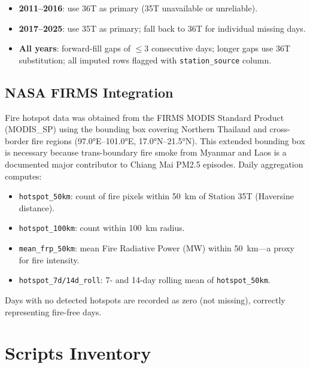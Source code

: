 \documentclass[12pt,a4paper]{report}
\begin{document}
\begin{itemize}
  \item \textbf{2011--2016}: use 36T as primary (35T unavailable or unreliable).
  \item \textbf{2017--2025}: use 35T as primary; fall back to 36T for individual missing days.
  \item \textbf{All years}: forward-fill gaps of $\leq 3$ consecutive days; longer gaps use 36T substitution; all imputed rows flagged with \texttt{station\_source} column.
\end{itemize}

\subsection{NASA FIRMS Integration}

Fire hotspot data was obtained from the FIRMS MODIS Standard Product (MODIS\_SP) using the bounding box covering Northern Thailand and cross-border fire regions (97.0°E--101.0°E, 17.0°N--21.5°N). This extended bounding box is necessary because trans-boundary fire smoke from Myanmar and Laos is a documented major contributor to Chiang Mai PM2.5 episodes. Daily aggregation computes:

\begin{itemize}
  \item \texttt{hotspot\_50km}: count of fire pixels within 50~km of Station 35T (Haversine distance).
  \item \texttt{hotspot\_100km}: count within 100~km radius.
  \item \texttt{mean\_frp\_50km}: mean Fire Radiative Power (MW) within 50~km---a proxy for fire intensity.
  \item \texttt{hotspot\_7d/14d\_roll}: 7- and 14-day rolling mean of \texttt{hotspot\_50km}.
\end{itemize}

Days with no detected hotspots are recorded as zero (not missing), correctly representing fire-free days.

\section{Scripts Inventory}
\end{document}
